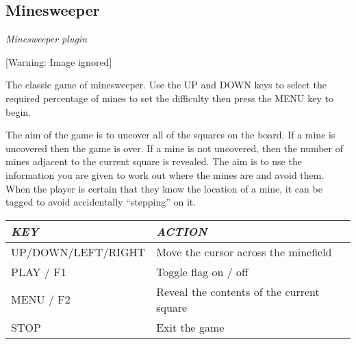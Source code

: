 \subsection{Minesweeper}
{\centering\itshape
Minesweeper plugin
\par}

\begin{center}
 [Warning: Image ignored] %

\end{center}
The classic game of minesweeper.  Use the UP and DOWN keys to select the
required percentage of mines to set the difficulty then press the MENU
key to begin.

The aim of the game is to uncover all of the squares on the board.  If a
mine is uncovered then the game is over.  If a mine is not uncovered,
then the number of mines adjacent to the current square is revealed. 
The aim is to use the information you are given to work out where the
mines are and avoid them.  When the player is certain that they know
the location of a mine, it can be tagged to avoid accidentally
``stepping'' on it.

\begin{tabular}[c]{|p{5.0210004cm}|p{10.77cm}|}
\hline
{\centering\bfseries\itshape
KEY
\par}
&
{\centering\bfseries\itshape
ACTION
\par}
\\\hline
{\centering
UP/DOWN/LEFT/RIGHT
\par}
&
Move the cursor across the minefield
\\\hline
{\centering
PLAY / F1
\par}
&
Toggle flag on / off
\\\hline
{\centering
MENU / F2
\par}
&
Reveal the contents of the current square
\\\hline
{\centering
STOP
\par}
&
Exit the game
\\\hline
\end{tabular}

